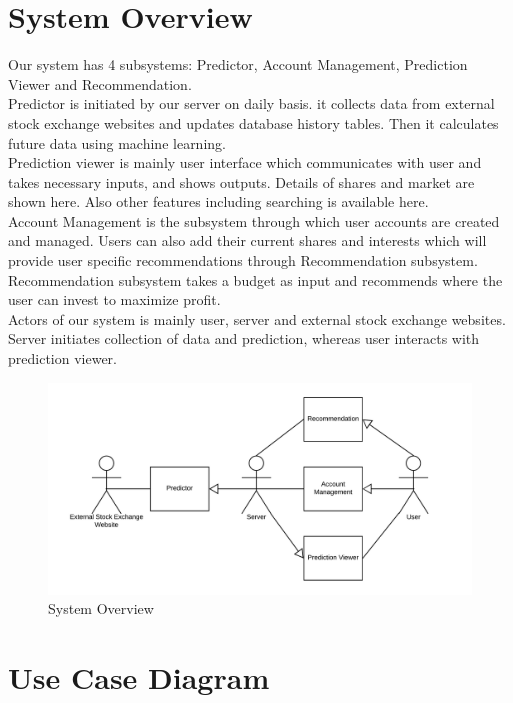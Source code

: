 \documentclass{article}[12pt]
\begin{document}
\section{System Overview}
    Our system has 4 subsystems: Predictor, Account Management, Prediction Viewer and Recommendation. \\
    Predictor is initiated by our server on daily basis. it collects data from external stock exchange websites and updates database history tables. Then it calculates future data using machine learning. \\
    Prediction viewer is mainly user interface which communicates with user and takes necessary inputs, and shows outputs. Details of shares and market are shown here. Also other features including searching is available here. \\
    Account Management is the subsystem through which user accounts are created and managed. Users can also add their current shares and interests which will provide user specific recommendations through Recommendation subsystem. Recommendation subsystem takes a budget as input and recommends where the user can invest to maximize profit. \\
    Actors of our system is mainly user, server and external stock exchange websites. Server initiates collection of data and prediction, whereas user interacts with prediction viewer.
    
    
    \begin{figure}[!h]
        \centering
        \includegraphics[width=.9\textwidth]{Images/System_Overview.png}
        \caption{System Overview}
    \end{figure}



\newpage
\section{Use Case Diagram}
\end{document}
